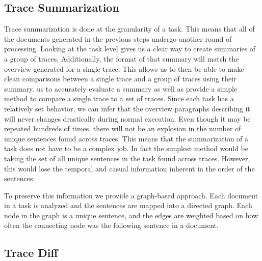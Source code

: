 \subsection{Trace Summarization}

Trace summarization is done at the granularity of a task. This means that all of the documents generated in the previous steps undergo another round of processing.
Looking at the task level gives us a clear way to create summaries of a group of traces. Additionally, the format of that summary will match the overview generated for a
single trace. This allows us to then be able to make clean comparisons between a single trace and a group of traces using their summary.
us to accurately evaluate a summary as well as provide a simple method to compare a single trace to a set of traces. Since each task has a relatively set behavior,
we can infer that the overview paragraphs describing it will never changes drastically during normal execution. Even though it may be repeated hundreds of times, 
there will not be an explosion in the number of unique sentences found across traces. This means that the 
summarization of a task does not have to be a complex job. In fact the simplest method would be taking the set of all unique sentences in the task found across
traces. However, this would lose the temporal and casual information inherent in the order of the sentences. 

To preserve this information we provide a graph-based
approach. Each document in a task is analyzed and the sentences are mapped into a directed graph. Each node in the graph is a unique sentence, and the edges are
weighted based on how often the connecting node was the following sentence in a document. 

\subsection{Trace Diff}